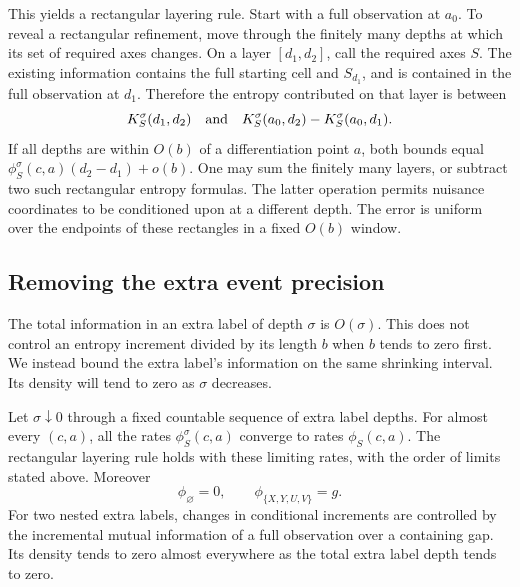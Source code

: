 This yields a rectangular layering rule.  Start with a full observation
at $a_0$.  To reveal a rectangular refinement, move through the finitely
many depths at which its set of required axes changes.  On a layer
$[d_1,d_2]$, call the required axes $S$.  The existing information
contains the full starting cell and $S_{d_1}$, and is contained in
the full observation at $d_1$.  Therefore the entropy contributed on
that layer is between
\begin{equation}
 K_S^\sigma(d_1,d_2)\quad\hbox{and}\quad
 K_S^\sigma(a_0,d_2)-K_S^\sigma(a_0,d_1).
 \label{eq:rectangular-layer-bounds}
\end{equation}
If all depths are within $O(b)$ of a differentiation point $a$, both
bounds equal $\phi_S^\sigma(c,a)(d_2-d_1)+o(b)$.
One may sum the finitely many layers, or subtract two such rectangular
entropy formulas.  The latter operation permits nuisance coordinates to
be conditioned upon at a different depth.  The error is uniform over
the endpoints of these rectangles in a fixed $O(b)$ window.

\subsection{Removing the extra event precision}

The total information in an extra label of depth $\sigma$ is
$O(\sigma)$.  This does not control an entropy increment divided by its
length $b$ when $b$ tends to zero first.  We instead bound the extra
label's information on the same shrinking interval.  Its density will
tend to zero as $\sigma$ decreases.

\begin{lemma}
\label{lem:remove-label}
Let $\sigma\downarrow0$ through a fixed countable sequence of extra
label depths.  For almost every $(c,a)$, all the rates
$\phi_S^\sigma(c,a)$ converge to rates $\phi_S(c,a)$.
The rectangular layering rule holds with these limiting rates, with
the order of limits stated above.  Moreover
\begin{equation}
 \phi_\varnothing=0,\qquad
 \phi_{\{X,Y,U,V\}}=g.
 \label{eq:entropy-full-rate}
\end{equation}
For two nested extra labels, changes in conditional increments are
controlled by the incremental mutual information of a full observation
over a containing gap.  Its density tends to zero almost everywhere as
the total extra label depth tends to zero.
\end{lemma}

